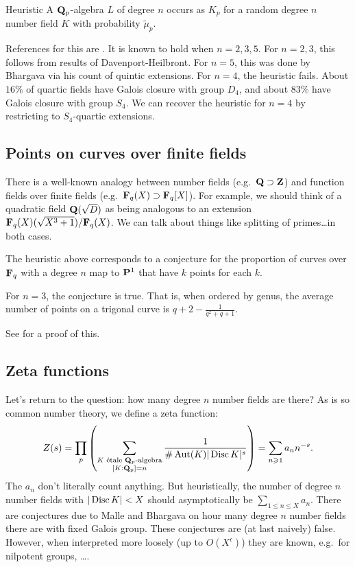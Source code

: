 \begin{enonce}{Heuristic}
A $\mathbf{Q}_p$-algebra $L$ of degree $n$ occurs as $K_p$ for a random degree $n$ 
number field $K$ with probability $\widetilde \mu_p$. 
\end{enonce}

References for this are \cite{b07,m02,m04}. It is known to hold when 
$n=2,3,5$. For $n=2,3$, this follows from results of Davenport-Heilbront. 
For $n=5$, this was done by Bhargava via his count of quintic extensions. For 
$n=4$, the heuristic fails. About $16\%$ of quartic fields have Galois closure 
with group $D_4$, and about $83\%$ have Galois closure with group $S_4$. We can 
recover the heuristic for $n=4$ by restricting to $S_4$-quartic extensions. 





\subsection{Points on curves over finite fields}

There is a well-known analogy between number fields (e.g.~$\mathbf{Q}\supset\mathbf{Z}$) and 
function fields over finite fields (e.g.~$\mathbf{F}_q(X)\supset \mathbf{F}_q[X]$). For 
example, we should think of a quadratic field $\mathbf{Q}(\sqrt D)$ as being analogous 
to an extension $\mathbf{F}_q(X)(\sqrt{X^3+1})/\mathbf{F}_q(X)$. We can talk about things 
like splitting of primes\ldots in both cases. 

The heuristic above corresponds to a conjecture for the proportion of curves 
over $\mathbf{F}_q$ with a degree $n$ map to $\mathbf{P}^1$ that have $k$ points for each 
$k$. 

\begin{theo}
For $n=3$, the conjecture is true. That is, when ordered by genus, the average 
number of points on a trigonal curve is $q+2 - \frac{1}{q^2+q+1}$. 
\end{theo}

See \cite{w12-trig} for a proof of this. 





\subsection{Zeta functions}

Let's return to the question: how many degree $n$ number fields are there? As 
is so common number theory, we define a zeta function: 
\[
  Z(s) = \prod_p \left(\sum_{\substack{K\text{ \'etale $\dQ_p$-algebra} \\ [K:\dQ_p]=n}} \frac{1}{\# \automorphism(K) |\discriminant K|^s}\right) = \sum_{n\geqslant 1} a_n n^{-s} .
\]
The $a_n$ don't literally count anything. But heuristically, 
the number of degree $n$ number fields with $|\operatorname{Disc} K|<X$ should 
asymptotically be $\sum_{1\leqslant n\leqslant X} a_n$. There are conjectures 
due to Malle and Bhargava on hour many degree $n$ number fields there are with 
fixed Galois group. These conjectures are (at last naively) false. However, when 
interpreted more loosely (up to $O(X^\epsilon)$) they are known, e.g.~for nilpotent 
groups, \ldots. 




